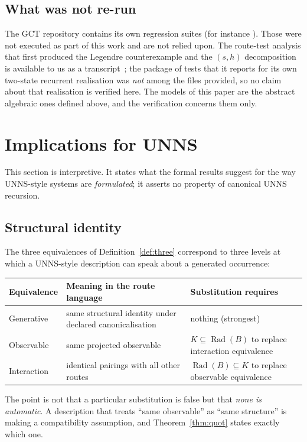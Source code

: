 \documentclass[11pt,a4paper]{article}
\newcommand{\Rad}{\operatorname{Rad}}
\theoremstyle{plain}
\theoremstyle{definition}
\begin{document}
\subsection{What was not re-run}
The GCT repository contains its own regression suites (for instance ). Those were not executed as part of this work and are not relied upon. The route-test analysis that first produced the Legendre counterexample and the $(s,h)$ decomposition is available to us as a transcript~\cite{G9}; the package of tests that it reports for its own two-state recurrent realisation was \emph{not} among the files provided, so no claim about that realisation is verified here. The models of this paper are the abstract algebraic ones defined above, and the verification concerns them only.

\section{Implications for UNNS}\label{sec:unns}
This section is interpretive. It states what the formal results suggest for the way UNNS-style systems are \emph{formulated}; it asserts no property of canonical UNNS recursion.

\subsection{Structural identity}
The three equivalences of Definition~\ref{def:three} correspond to three levels at which a UNNS-style description can speak about a generated occurrence:
\begin{center}\small
\begin{tabularx}{\textwidth}{@{}l>{\raggedright\arraybackslash}X>{\raggedright\arraybackslash}X@{}}
\toprule
Equivalence & Meaning in the route language & Substitution requires\\
\midrule
Generative & same structural identity under declared canonicalisation & nothing (strongest)\\
Observable & same projected observable & $K\subseteq\Rad(B)$ to replace interaction equivalence\\
Interaction & identical pairings with all other routes & $\Rad(B)\subseteq K$ to replace observable equivalence\\
\bottomrule
\end{tabularx}
\end{center}
The point is not that a particular substitution is false but that \emph{none is automatic}. A description that treats ``same observable'' as ``same structure'' is making a compatibility assumption, and Theorem~\ref{thm:quot} states exactly which one.
\end{document}
